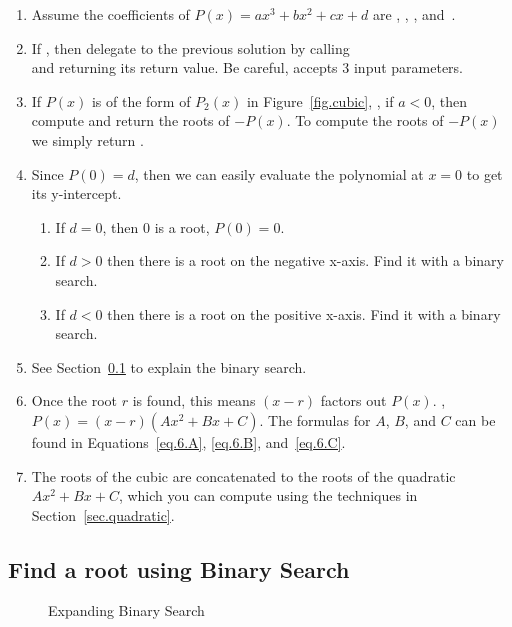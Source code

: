 \begin{enumerate}
\item Assume the coefficients of $P(x) = a x^3 + b x^2 + c x + d$ are
  ,  ,  ,  and~.
\item If , then delegate to the previous solution by
  calling \\
   and returning its return
  value.  Be careful,  accepts 3 input
  parameters.
\item If $P(x)$ is of the form of $P_2(x)$ in Figure~\ref{fig.cubic},
  \ie, if $a<0$, then compute and return the roots of $-P(x)$.  To
  compute the roots of $-P(x)$ we simply return
  .
\item Since $P(0) = d$, then we can easily evaluate the polynomial at $x=0$ to get its y-intercept.
  \begin{enumerate}
  \item If $d = 0$, then 0 is a root, $P(0) = 0$.
  \item If $d>0$ then there is a root on the negative x-axis.  Find it with a binary search.
  \item If $d<0$ then there is a root on the positive x-axis. Find it with a binary search.
  \end{enumerate}
\item See Section~\ref{sec.binary.search} to explain the binary search.
\item Once the root $r$ is found, this means $(x-r)$ factors out $P(x)$. \Ie,
  ${P(x) = (x-r)(A x^2 + B x + C)}$.  The formulas for $A$, $B$, and $C$ can be found
  in Equations~\eqref{eq.6.A}, \eqref{eq.6.B}, and~\eqref{eq.6.C}.
\item The roots of the cubic are \code{[r]} concatenated to the roots of the quadratic 
  $A x^2 + B x + C$, which you can compute using the techniques in Section~\ref{sec.quadratic}.
\end{enumerate}


\subsection{Find a root using Binary Search}
\label{sec.binary.search}


\begin{figure}
  \centering

  \caption{Expanding Binary Search} 
  \label{fig.cubic.binary}
\end{figure}

